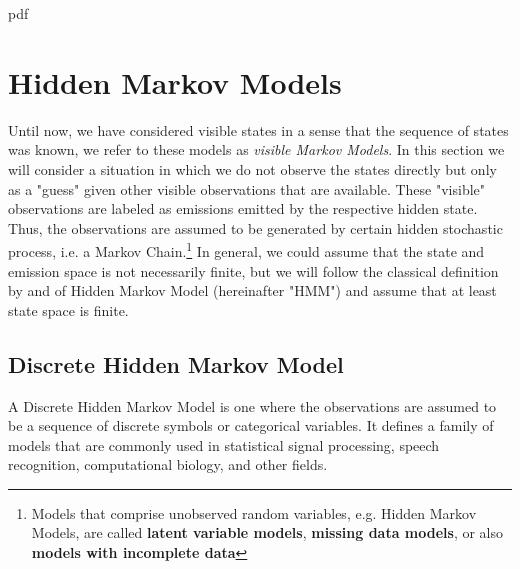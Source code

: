 

\if pdf
    \graphicspath{{Chapter4/Figs/Raster/}{Chapter4/Figs/PDF/}{Chapter4/Figs/}}
\else
    \graphicspath{{Chapter4/Figs/Vector/}{Chapter4/Figs/}}
\fi

\chapter{Hidden Markov Models}

Until now, we have considered visible states in a sense that the sequence of states was known, we refer to these models as \textit{visible Markov Models}.
In this section we will consider a situation in which we do not observe the states directly but only as a "guess" given other visible observations that are available. 
These "visible" observations are labeled as emissions emitted by the respective hidden state. Thus, the observations are assumed to be generated by certain hidden stochastic process, i.e. a Markov Chain.\footnote{Models that
comprise unobserved random variables, e.g. Hidden Markov Models, are called \textbf{latent variable models}, \textbf{missing data models}, or also \textbf{models with incomplete data}}
In general, we could assume that the state and emission space is not necessarily finite, but we will follow the classical definition by \citep{Rabiner1989} and \citep{Elliott1995} of Hidden Markov Model (hereinafter "HMM") and assume that at least state space is finite.

\section{Discrete Hidden Markov Model}

A Discrete Hidden Markov Model is one where the observations are assumed to be a sequence of discrete symbols or categorical variables. It defines a family of models that are
commonly used in statistical signal processing, speech recognition, computational biology, and other fields. \citep{Rabiner1989}

